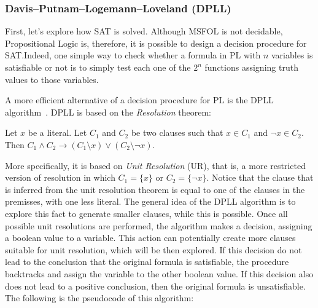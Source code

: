 \subsubsection{Davis–Putnam–Logemann–Loveland (DPLL)}

First, let’s explore how SAT is solved. Although MSFOL is not decidable, Propositional Logic is, therefore, it is possible to design a decision procedure for SAT.\@ Indeed, one simple way to check whether a formula in PL with $n$ variables is satisfiable or not is to simply test each one of the $2^{n}$ functions assigning truth values to those variables.

A more efficient alternative of a decision procedure for PL is the DPLL algorithm~\cite{dpll}. DPLL is based on the \textit{Resolution} theorem:

\begin{theorem}[Resolution]
Let $x$ be a literal. Let $C_{1}$ and $C_{2}$ be two clauses such that $x \in C_{1}$ and $\neg x \in C_{2}$. Then $C_{1} \wedge C_{2} \rightarrow (C_{1} \setminus x) \vee (C_{2} \setminus \neg x)$.
\end{theorem}

More specifically, it is based on \textit{Unit Resolution} (UR), that is, a more restricted version of resolution in which $C_{1} = \{x\}$ or $C_{2} = \{\neg x\}$. Notice that the clause that is inferred from the unit resolution theorem is equal to one of the clauses in the premisses, with one less literal. The general idea of the DPLL algorithm is to explore this fact to generate smaller clauses, while this is possible. Once all possible unit resolutions are performed, the algorithm makes a decision, assigning a boolean value to a variable. This action can potentially create more clauses suitable for unit resolution, which will be then explored. If this decision do not lead to the conclusion that the original formula is satisfiable, the procedure backtracks and assign the variable to the other boolean value. If this decision also does not lead to a positive conclusion, then the original formula is unsatisfiable. The following is the pseudocode of this algorithm:

